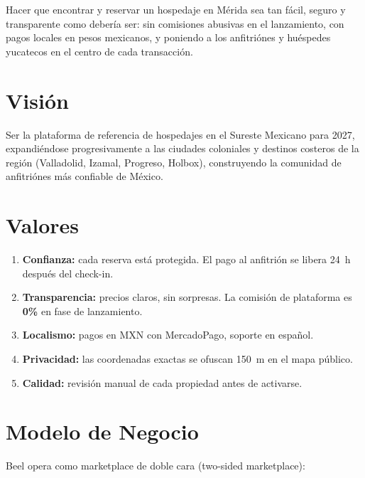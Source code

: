 \documentclass[12pt,a4paper]{report}
\begin{document}
\begin{tcolorbox}[beelbox, title={Misi\'on}]
Hacer que encontrar y reservar un hospedaje en M\'erida sea tan f\'acil, seguro y
transparente como deber\'ia ser: sin comisiones abusivas en el lanzamiento, con pagos
locales en pesos mexicanos, y poniendo a los anfitri\'ones y hu\'espedes yucatecos en el
centro de cada transacci\'on.
\end{tcolorbox}

\section{Visi\'on}

\begin{tcolorbox}[beelbox, title={Visi\'on}]
Ser la plataforma de referencia de hospedajes en el Sureste Mexicano para 2027,
expandi\'endose progresivamente a las ciudades coloniales y destinos costeros de la regi\'on
(Valladolid, Izamal, Progreso, Holbox), construyendo la comunidad de anfitri\'ones m\'as
confiable de M\'exico.
\end{tcolorbox}

\section{Valores}

\begin{enumerate}[leftmargin=*, label=\textbf{\arabic*.}]
  \item \textbf{Confianza:} cada reserva est\'a protegida. El pago al anfitri\'on se libera
        24~h despu\'es del check-in.
  \item \textbf{Transparencia:} precios claros, sin sorpresas. La comisi\'on de plataforma
        es \textbf{0\%} en fase de lanzamiento.
  \item \textbf{Localismo:} pagos en MXN con MercadoPago, soporte en espa\~nol.
  \item \textbf{Privacidad:} las coordenadas exactas se ofuscan 150~m en el mapa p\'ublico.
  \item \textbf{Calidad:} revisi\'on manual de cada propiedad antes de activarse.
\end{enumerate}

\section{Modelo de Negocio}

Beel opera como marketplace de doble cara (two-sided marketplace):
\end{document}

